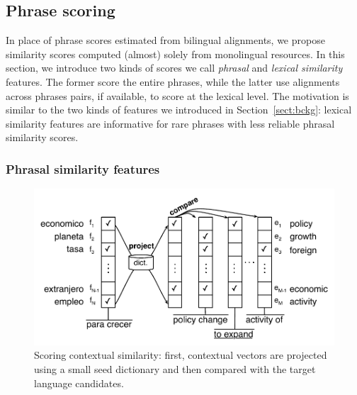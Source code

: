 \documentclass[11pt]{article}
\newcommand{\secref}[1]{Section~\ref{#1}}
\begin{document}
\subsection{Phrase scoring} \label{sect:score}

In place of phrase scores estimated from bilingual alignments, we propose similarity scores computed (almost) solely from monolingual resources.  In this section, we introduce two kinds of scores we call {\em phrasal} and {\em lexical similarity} features.  The former score the entire phrases, while the latter use alignments across phrases pairs, if available, to score at the lexical level.  The motivation is similar to the two kinds of features we introduced in \secref{sect:bckg}: lexical similarity features are informative for rare phrases with less reliable phrasal similarity scores.

\subsubsection{Phrasal similarity features} \label{sect:phrasalfeats}

\begin{figure}
\includegraphics[width=\linewidth]{../figures/contextual/contextual}
\caption{Scoring contextual similarity: first, contextual vectors are projected using a small seed dictionary and then compared with the target language candidates.}
\label{fig:contextual}
\end{figure}
\end{document}
